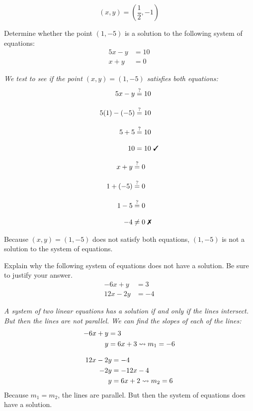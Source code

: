 \documentclass[12pt,letterpaper]{exam}
\begin{document}
\begin{questions}
{	\[
	\boxed{(x, y)= \left( \frac{1}{2}, -1 \right)}
	\]
}





\newpage
\question[5] Determine whether the point $(1, -5)$ is a solution to the following system of equations:
	\[
	\begin{aligned}
	5x - y&= 10 \\
	x + y&= 0 
	\end{aligned}
	\] \pspace

{\itshape We test to see if the point $(x, y)= (1, -5)$ satisfies both equations: 
	\[
	\begin{aligned}
	5x - y&\stackrel{?}{=} 10 \\[0.3cm]
	5(1) - (-5)&\stackrel{?}{=} 10 \\[0.3cm]
	5 + 5&\stackrel{?}{=} 10 \\[0.3cm]
	10&= 10 \text{ \cmark}
	\end{aligned}
	\] \pspace
	
	\[
	\begin{aligned}
	x + y&\stackrel{?}{=} 0 \\[0.3cm]
	1 + (-5)&\stackrel{?}{=} 0 \\[0.3cm]
	1 - 5&\stackrel{?}{=} 0 \\[0.3cm]
	-4&\neq 0 \text{ \xmark}
	\end{aligned}
	\]

Because $(x, y)= (1, -5)$ does not satisfy both equations, $(1, -5)$ is not a solution to the system of equations.}





\newpage
\question[5] Explain why the following system of equations does not have a solution. Be sure to justify your answer. 
	\[
	\begin{aligned}
	-6x + y&= 3 \\
	12x - 2y&= -4
	\end{aligned}
	\] \pspace

{\itshape A system of two linear equations has a solution if and only if the lines intersect. But then the lines are not parallel. We can find the slopes of each of the lines:
	\[
	\begin{aligned}
	-6x + y&= 3 \\
	y&= 6x + 3 \rightsquigarrow m_1= -6
	\end{aligned}
	\]

	\[
	\begin{aligned}
	12x - 2y&= -4 \\
	-2y&= -12x - 4 \\
	y&= 6x + 2 \rightsquigarrow m_2= 6
	\end{aligned}
	\]
Because $m_1= m_2$, the lines are parallel. But then the system of equations does have a solution. 
}


\end{questions}
\end{document}
